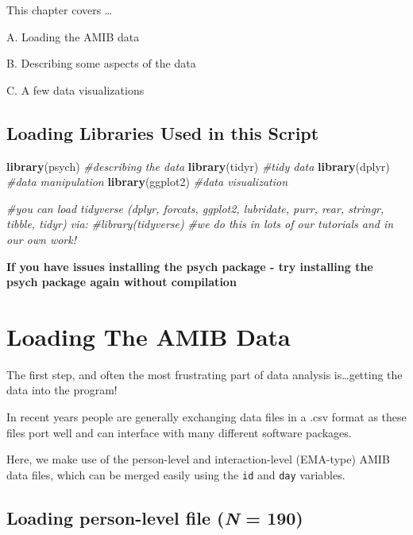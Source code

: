 \documentclass[
]{book}
\newenvironment{Shaded}{\begin{snugshade}}{\end{snugshade}}
\newcommand{\CommentTok}[1]{\textcolor[rgb]{0.56,0.35,0.01}{\textit{#1}}}
\newcommand{\FunctionTok}[1]{\textcolor[rgb]{0.13,0.29,0.53}{\textbf{#1}}}
\newcommand{\NormalTok}[1]{#1}
\theoremstyle{definition}
\theoremstyle{definition}
\theoremstyle{definition}
\theoremstyle{definition}
\theoremstyle{remark}
\begin{document}
This chapter covers \ldots{}

A. Loading the AMIB data

B. Describing some aspects of the data

C. A few data visualizations

\subsection{Loading Libraries Used in this Script}\label{loading-libraries-used-in-this-script}

\begin{Shaded}
\begin{Highlighting}[]
\FunctionTok{library}\NormalTok{(psych)      }\CommentTok{\#describing the data}
\FunctionTok{library}\NormalTok{(tidyr)      }\CommentTok{\#tidy data}
\FunctionTok{library}\NormalTok{(dplyr)      }\CommentTok{\#data manipulation}
\FunctionTok{library}\NormalTok{(ggplot2)    }\CommentTok{\#data visualization}

\CommentTok{\#you can load tidyverse (dplyr, forcats, ggplot2, lubridate, purr, rear, stringr, tibble, tidyr) via:}
\CommentTok{\#library(tidyverse)}
\CommentTok{\#we do this in lots of our tutorials and in our own work!}
\end{Highlighting}
\end{Shaded}

\textbf{If you have issues installing the psych package - try installing the psych package again without compilation}

\section{Loading The AMIB Data}\label{loading-the-amib-data}

The first step, and often the most frustrating part of data analysis is\ldots getting the data into the program!

In recent years people are generally exchanging data files in a .csv format as these files port well and can interface with many different software packages.

Here, we make use of the person-level and interaction-level (EMA-type) AMIB data files, which can be merged easily using the \texttt{id} and \texttt{day} variables.

\subsection{\texorpdfstring{Loading person-level file (\emph{N} = 190)}{Loading person-level file (N = 190)}}\label{loading-person-level-file-n-190}
\end{document}
